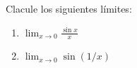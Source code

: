\begin{frame}

Clacule los siguientes límites:

\begin{enumerate}
\item $\lim_{x \to 0} \frac{\sin x}{x}$
\item $\lim_{x \to 0} \sin (1/x)$
\end{enumerate}

\end{frame}
